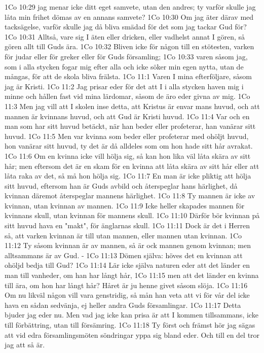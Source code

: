 1Co 10:29  jag menar icke ditt eget samvete, utan den andres; ty varför skulle jag låta min frihet dömas av en annans samvete?
1Co 10:30  Om jag äter därav med tacksägelse, varför skulle jag då bliva smädad för det som jag tackar Gud för?
1Co 10:31  Alltså, vare sig I äten eller dricken, eller vadhelst annat I gören, så gören allt till Guds ära.
1Co 10:32  Bliven icke för någon till en stötesten, varken för judar eller för greker eller för Guds församling;
1Co 10:33  varen såsom jag, som i alla stycken fogar mig efter alla och icke söker min egen nytta, utan de mångas, för att de skola bliva frälsta.
1Co 11:1  Varen I mina efterföljare, såsom jag är Kristi.
1Co 11:2  Jag prisar eder för det att I i alla stycken haven mig i minne och hållen fast vid mina lärdomar, såsom de äro eder givna av mig.
1Co 11:3  Men jag vill att I skolen inse detta, att Kristus är envar mans huvud, och att mannen är kvinnans huvud, och att Gud är Kristi huvud.
1Co 11:4  Var och en man som har sitt huvud betäckt, när han beder eller profeterar, han vanärar sitt huvud.
1Co 11:5  Men var kvinna som beder eller profeterar med ohöljt huvud, hon vanärar sitt huvud, ty det är då alldeles som om hon hade sitt hår avrakat.
1Co 11:6  Om en kvinna icke vill hölja sig, så kan hon lika väl låta skära av sitt hår; men eftersom det är en skam för en kvinna att låta skära av sitt hår eller att låta raka av det, så må hon hölja sig.
1Co 11:7  En man är icke pliktig att hölja sitt huvud, eftersom han är Guds avbild och återspeglar hans härlighet, då kvinnan däremot återspeglar mannens härlighet.
1Co 11:8  Ty mannen är icke av kvinnan, utan kvinnan av mannen.
1Co 11:9  Icke heller skapades mannen för kvinnans skull, utan kvinnan för mannens skull.
1Co 11:10  Därför bör kvinnan på sitt huvud hava en "makt", för änglarnas skull.
1Co 11:11  Dock är det i Herren så, att varken kvinnan är till utan mannen, eller mannen utan kvinnan.
1Co 11:12  Ty såsom kvinnan är av mannen, så är ock mannen genom kvinnan; men alltsammans är av Gud. -
1Co 11:13  Dömen själva: höves det en kvinnan att ohöljd bedja till Gud?
1Co 11:14  Lär icke själva naturen eder att det länder en man till vanheder, om han har långt hår,
1Co 11:15  men att det länder en kvinna till ära, om hon har långt hår? Håret är ju henne givet såsom slöja.
1Co 11:16  Om nu likväl någon vill vara genstridig, så mån han veta att vi för vår del icke hava en sådan sedvänja, ej heller andra Guds församlingar.
1Co 11:17  Detta bjuder jag eder nu. Men vad jag icke kan prisa är att I kommen tillsammans, icke till förbättring, utan till försämring.
1Co 11:18  Ty först och främst hör jag sägas att vid edra församlingsmöten söndringar yppa sig bland eder. Och till en del tror jag att så är.

